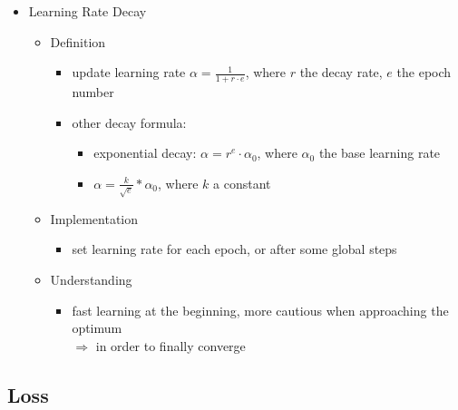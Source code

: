 \begin{itemize}
\item Learning Rate Decay
	\begin{itemize}
	\item Definition
		\begin{itemize}
		\item update learning rate $\alpha = \frac 1 {1+r\cdot e}$, where $r$ the decay rate, $e$ the epoch number
		\item other decay formula:
			\begin{itemize}
			\item exponential decay: $\alpha=r^e\cdot\alpha_0$, where $\alpha_0$ the base learning rate
			\item $\alpha=\frac k {\sqrt{e}} * \alpha_0$, where $k$ a constant
			\end{itemize}
		\end{itemize}
	\item Implementation
		\begin{itemize}
		\item set learning rate for each epoch, or after some global steps
		\end{itemize}
	\item Understanding
		\begin{itemize}
		\item fast learning at the beginning, more cautious when approaching the optimum \\ 
		$\Rightarrow$ in order to finally converge
		\end{itemize}
	\end{itemize}
\end{itemize}

\subsection{Loss}
